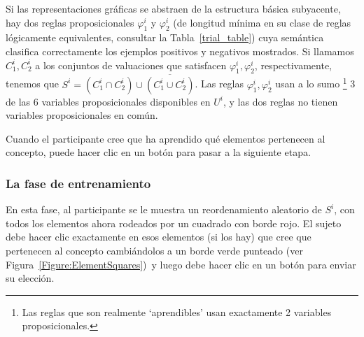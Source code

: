 Si las representaciones gráficas se abstraen de la estructura básica subyacente, hay dos reglas proposicionales $ \varphi^i_1 $ y $ \varphi^i_2 $ (de longitud mínima en su clase de reglas lógicamente equivalentes, consultar la Tabla~\ref{trial_table}) cuya semántica clasifica correctamente los ejemplos positivos y negativos mostrados. Si llamamos $ C^i_1, C^i_2 $ a los conjuntos de valuaciones que satisfacen $ \varphi^i_1, \varphi^i_2 $, respectivamente, tenemos que $ S^i = (C^i_1 \cap C^i_2) \cup \overline {(C^i_1 \cup C^i_2)} $. Las reglas $ \varphi^i_1, \varphi^i_2 $ usan a lo sumo \footnote{Las reglas que son realmente `aprendibles' usan exactamente 2 variables proposicionales.} 3 de las 6 variables proposicionales disponibles en $ U^i $, y las dos reglas no tienen variables proposicionales en común.

Cuando el participante cree que ha aprendido qué elementos pertenecen al concepto, puede hacer clic en un botón para pasar a la siguiente etapa.

\subsubsection{La fase de entrenamiento}\label{Subsection:training}

En esta fase, al participante se le muestra un reordenamiento aleatorio de $S^i $, con todos los elementos ahora rodeados por un cuadrado con borde rojo. El sujeto debe hacer clic exactamente en esos elementos (si los hay) que cree que pertenecen al concepto \textemdash cambiándolos a un borde verde punteado (ver Figura~\ref{Figure:ElementSquares})\textemdash \ y luego debe hacer clic en un botón para enviar su elección.

